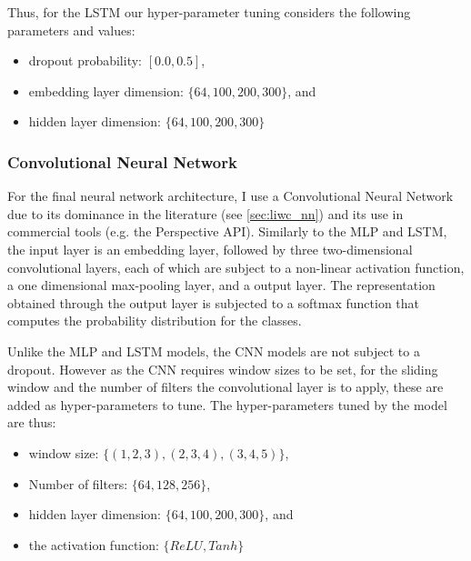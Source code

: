 Thus, for the LSTM our hyper-parameter tuning considers the following parameters and values:

\begin{itemize}
  \item dropout probability: $[0.0, 0.5]$,
  \item embedding layer dimension: $\{64, 100, 200, 300\}$, and
  \item hidden layer dimension: $\{64, 100, 200, 300\}$
\end{itemize}

\subsubsection{Convolutional Neural Network}

For the final neural network architecture, I use a Convolutional Neural Network due to its dominance in the literature (see \cref{sec:liwc_nn}) and its use in commercial tools (e.g. the Perspective API). Similarly to the MLP and LSTM, the input layer is an embedding layer, followed by three two-dimensional convolutional layers, each of which are subject to a non-linear activation function, a one dimensional max-pooling layer, and a output layer. The representation obtained through the output layer is subjected to a softmax function that computes the probability distribution for the classes.


Unlike the MLP and LSTM models, the CNN models are not subject to a dropout. However as the CNN requires window sizes to be set, for the sliding window and the number of filters the convolutional layer is to apply, these are added as hyper-parameters to tune. The hyper-parameters tuned by the model are thus:

\begin{itemize}
  \item window size: $\{(1, 2, 3), (2, 3, 4), (3, 4, 5)\}$,
  \item Number of filters: $\{64, 128, 256\}$,
  \item hidden layer dimension: $\{64, 100, 200, 300\}$, and
  \item the activation function: $\{ReLU, Tanh\}$
\end{itemize}


